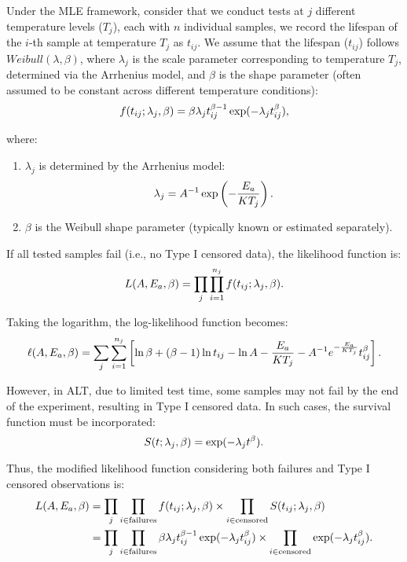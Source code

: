 \hspace*{8mm} Under the MLE framework, consider that we conduct tests at $j$ different temperature levels ($T_j$), each with $n$ individual samples, we record the lifespan of the $i$-th sample at temperature $T_j$ as $t_{ij}$. We assume that the lifespan ($t_{ij}$) follows $Weibull(\lambda, \beta)$, where $\lambda_j$ is the scale parameter corresponding to temperature $T_j$, determined via the Arrhenius model, and $\beta$ is the shape parameter (often assumed to be constant across different temperature conditions):
\begin{equation} \notag
f(t_{ij}; \lambda_j, \beta) = \beta \lambda_j t_{ij}^{\beta - 1} \exp(-\lambda_j t_{ij}^\beta),
\end{equation}

where:
\begin{enumerate}
\item $\lambda_j$  is determined by the Arrhenius model:
\begin{equation} \notag
\lambda_j = A^{-1} \exp\left(-\frac{E_a}{K T_j}\right).
\end{equation}
\item $\beta$ is the Weibull shape parameter (typically known or estimated separately).
\end{enumerate}

If all tested samples fail (i.e., no Type I censored data), the likelihood function is:
\begin{equation} \notag
L(A, E_a, \beta) = \prod_{j} \prod_{i=1}^{n_j} f(t_{ij}; \lambda_j, \beta).
\end{equation}

Taking the logarithm, the log-likelihood function becomes:
\begin{equation} \notag
\ell(A, E_a, \beta) = \sum_j \sum_{i=1}^{n_j} \left[ \ln \beta + (\beta - 1) \ln t_{ij} - \ln A - \frac{E_a}{K T_j} - A^{-1} e^{-\frac{E_a}{K T_j}} t_{ij}^\beta \right].
\end{equation}

\hspace*{8mm} However, in ALT, due to limited test time, some samples may not fail by the end of the experiment, resulting in Type I censored data. In such cases, the survival function must be incorporated:
\begin{equation} \notag
S(t; \lambda_j, \beta) = \exp(-\lambda_j t^\beta).
\end{equation}

\hspace*{8mm} Thus, the modified likelihood function considering both failures and Type I censored observations is:
\begin{align}
L(A, E_a, \beta) &= \prod_{j} \prod_{i \in \text{failures}} f(t_{ij}; \lambda_j, \beta) \times \prod_{i \in \text{censored}} S(t_{ij}; \lambda_j, \beta) \notag \\
&= \prod_{j} \prod_{i \in \text{failures}} \beta \lambda_j t_{ij}^{\beta - 1} \exp(-\lambda_j t_{ij}^\beta) \times \prod_{i \in \text{censored}} \exp(-\lambda_j t_{ij}^\beta). \notag
\end{align}

